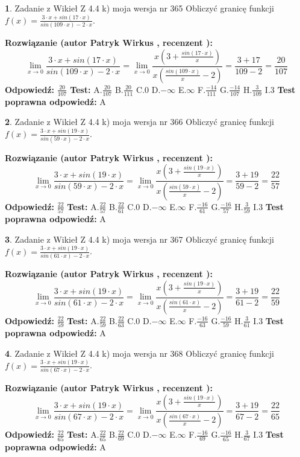 \documentclass[12pt, a4paper]{article}
\theoremstyle{definition} %
\newtheorem{zad}{}
\newcommand{\zadStart}[1]{\begin{zad}#1\newline}
\newcommand{\zadStop}{\end{zad}}
\newcommand{\rozwStart}[2]{\noindent \textbf{Rozwiązanie (autor #1 , recenzent #2): }\newline}
\newcommand{\rozwStop}{\newline}
\newcommand{\odpStart}{\noindent \textbf{Odpowiedź:}\newline}
\newcommand{\odpStop}{\newline}
\newcommand{\testStart}{\noindent \textbf{Test:}\newline}
\newcommand{\testStop}{\newline}
\newcommand{\kluczStart}{\noindent \textbf{Test poprawna odpowiedź:}\newline}
\newcommand{\kluczStop}{\newline}
\begin{document}
\zadStart{Zadanie z Wikieł Z 4.4 k) moja wersja nr 365}
Obliczyć granicę funkcji $f(x)=\frac{3\cdot x +sin(17\cdot x)}{sin(109\cdot x) -2\cdot x}$.
\zadStop
\rozwStart{Patryk Wirkus}{}
$$\lim\limits_{x\to 0}\frac{3\cdot x +sin(17\cdot x)}{sin(109\cdot x) -2\cdot x}
=\lim\limits_{x\to 0}\frac{x(3+\frac{sin(17\cdot x)}{x})}{x(\frac{sin(109\cdot x)}{x}-2)}
=\frac{3+17}{109-2} = \frac{20}{107}$$
\rozwStop
\odpStart
$\frac{20}{107}$
\odpStop
\testStart
A.$\frac{20}{107}$
B.$\frac{20}{111}$
C.$0$
D.$-\infty$
E.$\infty$
F.$\frac{-14}{111}$
G.$\frac{-14}{107}$
H.$\frac{3}{109}$
I.$3$
\testStop
\kluczStart
A
\kluczStop



\zadStart{Zadanie z Wikieł Z 4.4 k) moja wersja nr 366}
Obliczyć granicę funkcji $f(x)=\frac{3\cdot x +sin(19\cdot x)}{sin(59\cdot x) -2\cdot x}$.
\zadStop
\rozwStart{Patryk Wirkus}{}
$$\lim\limits_{x\to 0}\frac{3\cdot x +sin(19\cdot x)}{sin(59\cdot x) -2\cdot x}
=\lim\limits_{x\to 0}\frac{x(3+\frac{sin(19\cdot x)}{x})}{x(\frac{sin(59\cdot x)}{x}-2)}
=\frac{3+19}{59-2} = \frac{22}{57}$$
\rozwStop
\odpStart
$\frac{22}{57}$
\odpStop
\testStart
A.$\frac{22}{57}$
B.$\frac{22}{61}$
C.$0$
D.$-\infty$
E.$\infty$
F.$\frac{-16}{61}$
G.$\frac{-16}{57}$
H.$\frac{3}{59}$
I.$3$
\testStop
\kluczStart
A
\kluczStop



\zadStart{Zadanie z Wikieł Z 4.4 k) moja wersja nr 367}
Obliczyć granicę funkcji $f(x)=\frac{3\cdot x +sin(19\cdot x)}{sin(61\cdot x) -2\cdot x}$.
\zadStop
\rozwStart{Patryk Wirkus}{}
$$\lim\limits_{x\to 0}\frac{3\cdot x +sin(19\cdot x)}{sin(61\cdot x) -2\cdot x}
=\lim\limits_{x\to 0}\frac{x(3+\frac{sin(19\cdot x)}{x})}{x(\frac{sin(61\cdot x)}{x}-2)}
=\frac{3+19}{61-2} = \frac{22}{59}$$
\rozwStop
\odpStart
$\frac{22}{59}$
\odpStop
\testStart
A.$\frac{22}{59}$
B.$\frac{22}{63}$
C.$0$
D.$-\infty$
E.$\infty$
F.$\frac{-16}{63}$
G.$\frac{-16}{59}$
H.$\frac{3}{61}$
I.$3$
\testStop
\kluczStart
A
\kluczStop



\zadStart{Zadanie z Wikieł Z 4.4 k) moja wersja nr 368}
Obliczyć granicę funkcji $f(x)=\frac{3\cdot x +sin(19\cdot x)}{sin(67\cdot x) -2\cdot x}$.
\zadStop
\rozwStart{Patryk Wirkus}{}
$$\lim\limits_{x\to 0}\frac{3\cdot x +sin(19\cdot x)}{sin(67\cdot x) -2\cdot x}
=\lim\limits_{x\to 0}\frac{x(3+\frac{sin(19\cdot x)}{x})}{x(\frac{sin(67\cdot x)}{x}-2)}
=\frac{3+19}{67-2} = \frac{22}{65}$$
\rozwStop
\odpStart
$\frac{22}{65}$
\odpStop
\testStart
A.$\frac{22}{65}$
B.$\frac{22}{69}$
C.$0$
D.$-\infty$
E.$\infty$
F.$\frac{-16}{69}$
G.$\frac{-16}{65}$
H.$\frac{3}{67}$
I.$3$
\testStop
\kluczStart
A
\kluczStop
\end{document}
